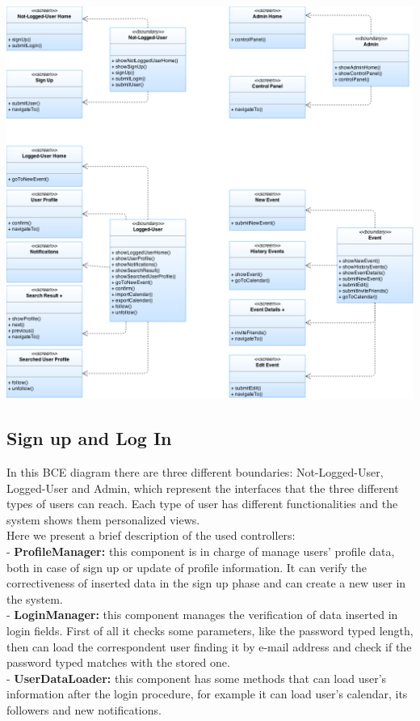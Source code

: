 \documentclass[12pt]{book}
\begin{document}
\includegraphics[scale=0.45]{map_UX_bound}\\
\newpage
\subsection{Sign up and Log In}
In this BCE diagram there are three different boundaries: Not-Logged-User, Logged-User and Admin, which represent the interfaces that the three different types of users can reach. Each type of user has different functionalities and the system shows them personalized views.\\
Here we present a brief description of the used controllers:\\
- \textbf{ProfileManager:} 
	this component is in charge of manage users' profile data, both in case of sign up or update of 	profile information. It can verify the correctiveness of inserted data in the sign up phase and can 	create a new user in the system.\\
- \textbf{LoginManager:}
	this component manages the verification of data inserted in login fields. First of all it checks some parameters, like the password typed length, then can load the correspondent user finding it by e-mail address and check if the password typed matches with the stored one.\\
- \textbf{UserDataLoader:}
	this component has some methods that can load user's information after the login procedure, for example it can load user's calendar, its followers and new notifications.\\
	
\end{document}

